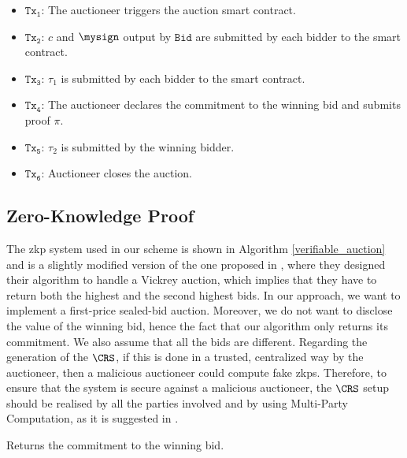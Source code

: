 	\begin{itemize}
		\item $\mathtt{Tx_1}$: The auctioneer triggers the auction smart contract.
		\item $\mathtt{Tx_2}$: $c$ and $\mysign$ output by $\mathtt{Bid}$ are submitted by each bidder to the smart contract.
		\item $\mathtt{Tx_3}$: $\tau_1$ is submitted by each bidder to the smart contract.
		\item $\mathtt{Tx_4}$: The auctioneer declares the commitment to the winning bid and submits proof $\pi$.
		\item $\mathtt{Tx_5}$: $\tau_2$ is submitted by the winning bidder.
		\item $\mathtt{Tx_6}$: Auctioneer closes the auction.
	\end{itemize}

\subsection{Zero-Knowledge Proof}
	The \gls{zkp} system used in our scheme is shown in Algorithm \ref{verifiable_auction} and is a slightly modified version of the one proposed in \cite{galal2018succinctly}, where they designed their algorithm to handle a Vickrey auction, which implies that they have to return both the highest and the second highest bids. In our approach, we want to implement a first-price sealed-bid auction. Moreover, we do not want to disclose the value of the winning bid, hence the fact that our algorithm only returns its commitment. We also assume that all the bids are different. Regarding the generation of the $\CRS$, if this is done in a trusted, centralized way by the auctioneer, then a malicious auctioneer could compute fake \glspl{zkp}. Therefore, to ensure that the system is secure against a malicious auctioneer, the $\CRS$ setup should be realised by all the parties involved and by using Multi-Party Computation, as it is suggested in \cite{mpc_crs}.

\begin{algorithm}
  \DontPrintSemicolon%
  \caption{Returns the commitment to the winning bid.}%
  \label{verifiable_auction}%
\end{algorithm}

